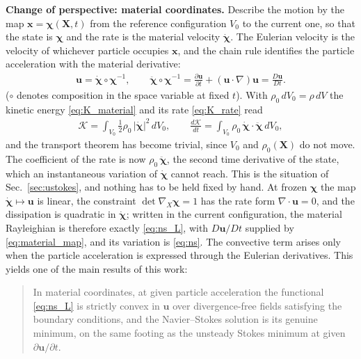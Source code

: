 \documentclass[aip,pof,reprint,amsmath,amssymb,longbibliography]{revtex4-2}
\begin{document}
\textbf{Change of perspective: material coordinates.} Describe the motion by the map $\boldsymbol{x} = \boldsymbol{\chi}(\boldsymbol{X}, t)$ from the reference configuration $V_0$ to the current one, so that the state is $\boldsymbol{\chi}$ and the rate is the material velocity $\dot{\boldsymbol{\chi}}$. The Eulerian velocity is the velocity of whichever particle occupies $\boldsymbol{x}$, and the chain rule identifies the particle acceleration with the material derivative:
\begin{align}
    \boldsymbol{u} = \dot{\boldsymbol{\chi}} \circ \boldsymbol{\chi}^{-1}, \qquad
    \ddot{\boldsymbol{\chi}} \circ \boldsymbol{\chi}^{-1} = \frac{\partial \boldsymbol{u}}{\partial t} + (\boldsymbol{u} \cdot \nabla)\boldsymbol{u} = \frac{D\boldsymbol{u}}{Dt}. \label{eq:material_map}
\end{align}
($\circ$ denotes composition in the space variable at fixed $t$). With $\rho_0\, dV_0 = \rho\, dV$ the kinetic energy \eqref{eq:K_material} and its rate \eqref{eq:K_rate} read
\begin{align}
    \mathcal{K} = \int_{V_0} \tfrac{1}{2}\rho_0\, |\dot{\boldsymbol{\chi}}|^2 \, dV_0, \qquad
    \frac{d\mathcal{K}}{dt} = \int_{V_0} \rho_0\, \dot{\boldsymbol{\chi}} \cdot \ddot{\boldsymbol{\chi}} \, dV_0, \label{eq:K_material_coords}
\end{align}
and the transport theorem has become trivial, since $V_0$ and $\rho_0(\boldsymbol{X})$ do not move. The coefficient of the rate is now $\rho_0\, \ddot{\boldsymbol{\chi}}$, the second time derivative of the state, which an instantaneous variation of $\dot{\boldsymbol{\chi}}$ cannot reach. This is the situation of Sec.~\ref{sec:ustokes}, and nothing has to be held fixed by hand. At frozen $\boldsymbol{\chi}$ the map $\dot{\boldsymbol{\chi}} \mapsto \boldsymbol{u}$ is linear, the constraint $\det \nabla_{\!X}\boldsymbol{\chi} = 1$ has the rate form $\nabla \cdot \boldsymbol{u} = 0$, and the dissipation is quadratic in $\dot{\boldsymbol{\chi}}$; written in the current configuration, the material Rayleighian is therefore exactly \eqref{eq:ns_L}, with $D\boldsymbol{u}/Dt$ supplied by \eqref{eq:material_map}, and its variation is \eqref{eq:ns}. The convective term arises only when the particle acceleration is expressed through the Eulerian derivatives. This yields one of the main results of this work:
\begin{quote}
    In material coordinates, at given particle acceleration the functional \eqref{eq:ns_L} is strictly convex in $\boldsymbol{u}$ over divergence-free fields satisfying the boundary conditions, and the Navier--Stokes solution is its genuine minimum, on the same footing as the unsteady Stokes minimum at given $\partial\boldsymbol{u}/\partial t$.
\end{quote}
\end{document}
